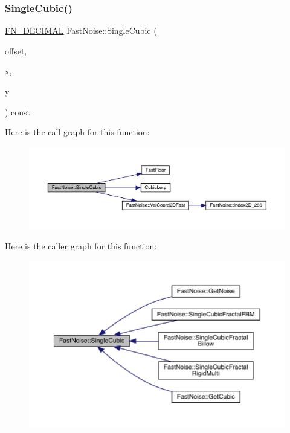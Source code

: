 \subsubsection{\texorpdfstring{Single\+Cubic()}{SingleCubic()}\hspace{0.1cm}{\footnotesize\ttfamily [1/2]}}
{\footnotesize\ttfamily \mbox{\hyperlink{_fast_noise_8h_a75a9ef6d2541c4921815b885bfd449c3}{F\+N\+\_\+\+D\+E\+C\+I\+M\+AL}} Fast\+Noise\+::\+Single\+Cubic (\begin{DoxyParamCaption}\item[{unsigned char}]{offset,  }\item[{\mbox{\hyperlink{_fast_noise_8h_a75a9ef6d2541c4921815b885bfd449c3}{F\+N\+\_\+\+D\+E\+C\+I\+M\+AL}}}]{x,  }\item[{\mbox{\hyperlink{_fast_noise_8h_a75a9ef6d2541c4921815b885bfd449c3}{F\+N\+\_\+\+D\+E\+C\+I\+M\+AL}}}]{y }\end{DoxyParamCaption}) const\hspace{0.3cm}{\ttfamily [private]}}

Here is the call graph for this function\+:
\nopagebreak
\begin{figure}[H]
\begin{center}
\leavevmode
\includegraphics[width=350pt]{d1/dd8/class_fast_noise_a31ce14d8b90143da35b074d5fdeda85c_cgraph}
\end{center}
\end{figure}
Here is the caller graph for this function\+:
\nopagebreak
\begin{figure}[H]
\begin{center}
\leavevmode
\includegraphics[width=350pt]{d1/dd8/class_fast_noise_a31ce14d8b90143da35b074d5fdeda85c_icgraph}
\end{center}
\end{figure}
\mbox{\label{class_fast_noise_a916d50d82702accf7842f5376619560e}} 
